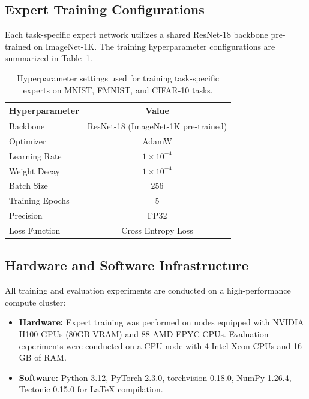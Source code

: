 \documentclass{article}
\theoremstyle{plain}
\theoremstyle{definition}
\theoremstyle{remark}
\begin{document}
\subsection{Expert Training Configurations}
Each task-specific expert network utilizes a shared ResNet-18 backbone pre-trained on ImageNet-1K. The training hyperparameter configurations are summarized in Table~\ref{tab:hyperparameters}.

\begin{table}[H]
\caption{Hyperparameter settings used for training task-specific experts on MNIST, FMNIST, and CIFAR-10 tasks.}
\label{tab:hyperparameters}
\vskip 0.15in
\begin{center}
\begin{small}
\begin{tabular}{lc}
\toprule
Hyperparameter & Value \\
\midrule
Backbone & ResNet-18 (ImageNet-1K pre-trained) \\
Optimizer & AdamW \\
Learning Rate & $1 \times 10^{-4}$ \\
Weight Decay & $1 \times 10^{-4}$ \\
Batch Size & 256 \\
Training Epochs & 5 \\
Precision & FP32 \\
Loss Function & Cross Entropy Loss \\
\bottomrule
\end{tabular}
\end{small}
\end{center}
\vskip -0.1in
\end{table}

\subsection{Hardware and Software Infrastructure}
All training and evaluation experiments are conducted on a high-performance compute cluster:
\begin{itemize}
    \item \textbf{Hardware:} Expert training was performed on nodes equipped with NVIDIA H100 GPUs (80GB VRAM) and 88 AMD EPYC CPUs. Evaluation experiments were conducted on a CPU node with 4 Intel Xeon CPUs and 16 GB of RAM.
    \item \textbf{Software:} Python 3.12, PyTorch 2.3.0, torchvision 0.18.0, NumPy 1.26.4, Tectonic 0.15.0 for LaTeX compilation.
\end{itemize}
\end{document}
